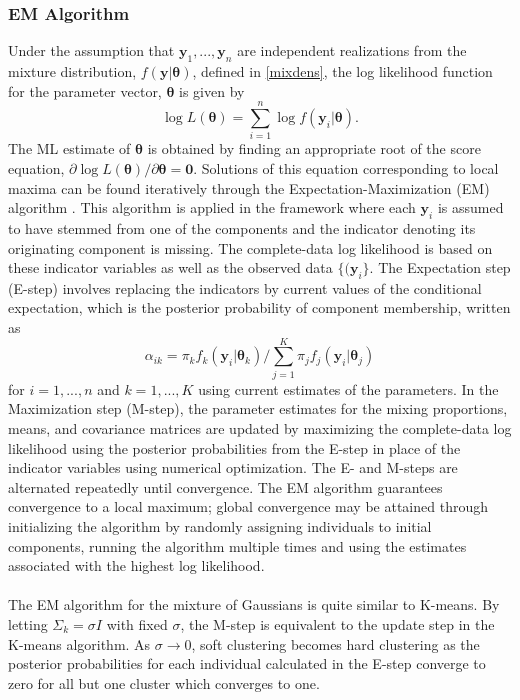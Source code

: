 \documentclass[12pt]{article}
\newcommand{\B}[0]{\mathbf}
\newcommand{\bs}[0]{\boldsymbol}
\begin{document}
\subsubsection{EM Algorithm}
Under the assumption that $\B y_{1},...,\B y_{n}$ are independent realizations from the mixture distribution, $f(\B y | \bs\theta)$, defined in \ref{mixdens}, the log likelihood function for the parameter vector, $\bs \theta$ is given by
$$\log L(\bs\theta)=\sum^{n}_{i=1}\log f(\B y_{i}|\bs \theta).$$
The ML estimate of $\bs\theta$ is obtained by finding an appropriate root of the score equation, $\partial \log L(\bs\theta)/\partial \bs\theta=\B 0.$
Solutions of this equation corresponding to local maxima can be found iteratively through the Expectation-Maximization (EM) algorithm \cite{dempster1977}. This algorithm is applied in the framework where each $\B y_{i}$ is assumed to have stemmed from one of the components and the indicator denoting its originating component is missing. The complete-data log likelihood is based on these indicator variables as well as the observed data $\{(\B y_{i}\}$. The Expectation step (E-step) involves replacing the indicators by current values of the conditional expectation, which is the posterior probability of component membership, written as
$$\alpha_{ik}=\pi_{k}f_{k}(\B y_{i}|\bs\theta_{k})/\sum_{j=1}^{K}\pi_{j}f_{j}(\B y_{i}|\bs \theta_{j})$$
for $i=1,...,n$ and $k=1,...,K$ using current estimates of the parameters. In the Maximization step (M-step), the parameter estimates for the mixing proportions, means, and covariance matrices are updated by maximizing the complete-data log likelihood using the posterior probabilities from the E-step in place of the indicator variables using numerical optimization. The E- and M-steps are alternated repeatedly until convergence. The EM algorithm guarantees convergence to a local maximum; global convergence may be attained through initializing the algorithm by randomly assigning individuals to initial components, running the algorithm multiple times and using the estimates associated with the highest log likelihood.\\\\
The EM algorithm for the mixture of Gaussians is quite similar to K-means. By letting $\Sigma_{k} =\sigma I$ with fixed $\sigma$, the M-step is equivalent to the update step in the K-means algorithm. As $\sigma\rightarrow 0$, soft clustering becomes hard clustering as the posterior probabilities for each individual calculated in the E-step converge to zero for all but one cluster which converges to one. 
\end{document}
